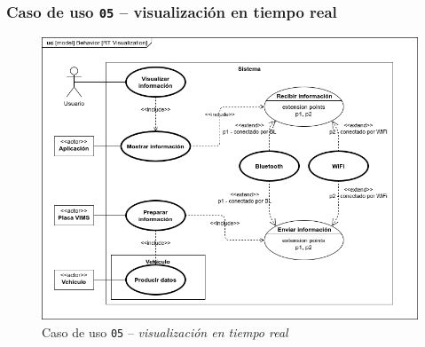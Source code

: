 \subsubsection{Caso de uso \texttt{05} -- visualización en tiempo real}

\begin{figure}[H]
  \centering
  \includegraphics[width=\linewidth]{diagrams/UseCases-UC5 - visualization.png}
  \caption{Caso de uso \texttt{05} -- \textit{visualización en tiempo real}}
  \label{uc:visualization}
\end{figure}


